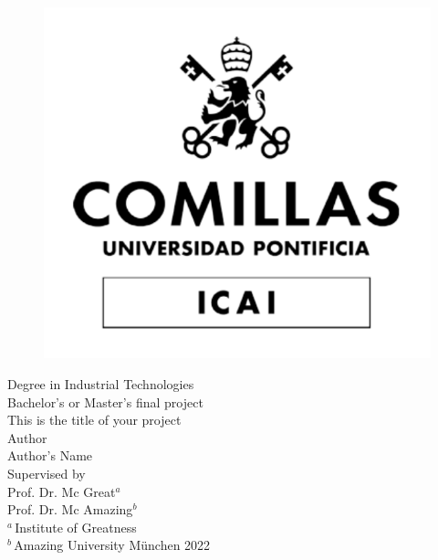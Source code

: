 \pagestyle{empty} %


\begin{center}
	\begin{figure}
		\centering
		\includegraphics[width=0.3\linewidth]{LogoUniversidadBN}
	\end{figure}
	\Large Degree in Industrial Technologies \\ %
	\vspace*{2.5em} %
	Bachelor's or Master's final project \\ %
	\vspace*{1em}
	This is the title of your project
	\\ \large
	\vspace*{3em}
	Author \\
	Author's Name \\
	\vspace*{1em}
	Supervised by \\ Prof. Dr. Mc Great$^a$ \\ Prof. Dr. Mc Amazing$^b$ \\
	$^a\,${\footnotesize Institute of Greatness} \\ $^b\,${\footnotesize Amazing University}
	\vfill
	München 2022 %
\end{center}

\cleardoublepage
